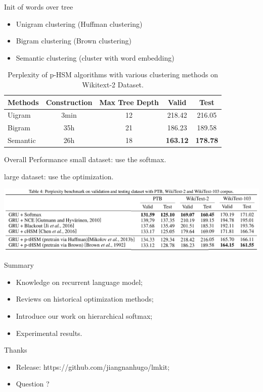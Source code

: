 \documentclass[english]{beamer} %
\begin{document}
\begin{frame}[<+->]{Init of words over tree}
\begin{itemize}
  \item Unigram clustering (Huffman clustering)
  \item Bigram clustering (Brown clustering)
  \item Semantic clustering (cluster with word embedding)
\end{itemize}

\begin{table}[!t]
\setlength{\abovecaptionskip}{0pt}
\setlength{\abovedisplayskip}{0pt}
  \centering
   \caption{Perplexity of p-HSM algorithms with various clustering methods on Wikitext-2 Dataset.\label{table:p-thsm}}
  \begin{tabular}{lcccc} \toprule
  Methods   &Construction&Max Tree Depth &Valid & Test   \\ \midrule
  Uigram  &3min&12 &218.42& 216.05     \\
  Bigram  &35h&21& 186.23& 189.58\\
  Semantic &26h &18& \textbf{163.12} & \textbf{178.78}\\
\bottomrule
  \end{tabular}
\end{table}
\end{frame}

\begin{frame}[<+->]{Overall Performance}
small dataset: use the softmax.

large dataset: use the optimization.
\begin{center}
    \includegraphics[scale=0.33]{benchmark.png}
  \end{center}
\end{frame}


\begin{frame}[<+->]{Summary}
\begin{itemize}
\item Knowledge on recurrent language model;
\item Reviews on historical optimization methods;
\item Introduce our work on hierarchical softmax;
\item Experimental results.
\end{itemize}
\end{frame}
\begin{frame}[<+->]{Thanks}
\begin{itemize}
\item Release: https://github.com/jiangnanhugo/lmkit;
\item Question ?
\end{itemize}
\end{frame}


\end{document}
